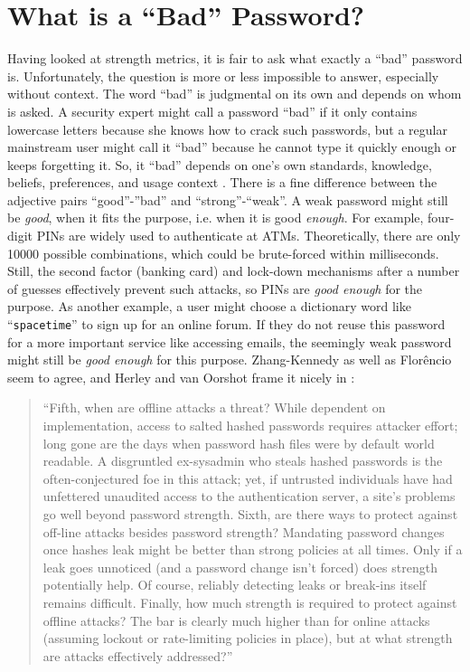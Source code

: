 \section{What is a ``Bad'' Password?}\label{sec:rw:whats_a_bad_pw}
Having looked at strength metrics, it is fair to ask what exactly a ``bad'' password is. Unfortunately, the question is more or less impossible to answer, especially without context. The word ``bad'' is judgmental on its own and depends on whom is asked. A security expert might call a password ``bad'' if it only contains lowercase letters because she knows how to crack such passwords, but a regular mainstream user might call it ``bad'' because he cannot type it quickly enough or keeps forgetting it. So, it ``bad'' depends on one's own standards, knowledge, beliefs, preferences, and usage context \cite{Gaw2005ReuseRecycle, Haque2014Hierarchy}. There is a fine difference between the adjective pairs ``good''-''bad'' and ``strong''-``weak''. A weak password might still be \textit{good}, when it fits the purpose, i.e. when it is good \textit{enough}. For example, four-digit PINs are widely used to authenticate at ATMs. Theoretically, there are only 10000 possible combinations, which could be brute-forced within milliseconds. Still, the second factor (banking card) and lock-down mechanisms after a number of guesses effectively prevent such attacks, so PINs are \textit{good enough} for the purpose. As another example, a user might choose a dictionary word like ``\texttt{spacetime}'' to sign up for an online forum. If they do not reuse this password for a more important service like accessing emails, the seemingly weak password might still be \textit{good enough} for this purpose. Zhang-Kennedy \etal \cite{ZhangKennedy2016RevisitingPasswordRules} as well as Florêncio \etal \cite{Florencio2007DoStrongWebPasswords, Florencio2014AdministratorsGuide, Florencio2014PasswordPortfoliosFiniteUser, Florencio2016CommACM} seem to agree, and Herley and van Oorshot frame it nicely in \cite{Herley2012PersistenceOfPasswords}:

\begin{quote}
	``Fifth, when are offline attacks a threat? While dependent on implementation, access to salted hashed passwords requires attacker effort; long gone are the days when password hash files were by default world readable. A disgruntled ex-sysadmin who steals hashed passwords is the often-conjectured foe in this attack; yet, if untrusted individuals have had unfettered unaudited access to the authentication server, a site’s problems go well beyond password strength. Sixth, are there ways to protect against off-line attacks besides password strength? Mandating password changes once hashes leak might be better than strong policies at all times. Only if a leak goes unnoticed (and a password change isn't forced) does strength potentially help. Of course, reliably detecting leaks or break-ins itself remains difficult. Finally, how much strength is required to protect against offline attacks? The bar is clearly much higher than for online attacks (assuming lockout or rate-limiting policies in place), but at what strength are attacks effectively addressed?'' 
\end{quote}

